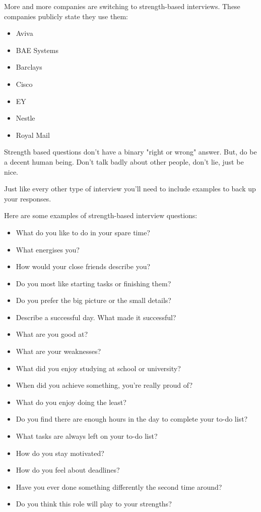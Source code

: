 \documentclass{article}
\begin{document}
More and more companies are switching to strength-based interviews.
These companies publicly state they use them:

\begin{itemize}
\item
  Aviva
\item
  BAE Systems
\item
  Barclays
\item
  Cisco
\item
  EY
\item
  Nestle
\item
  Royal Mail
\end{itemize}
Strength based questions don't have a binary "right or wrong" answer.
But, do be a decent human being. Don't talk badly about other people,
don't lie, just be nice.

Just like every other type of interview you'll need to include examples
to back up your responses.

Here are some examples of strength-based interview questions:

\begin{itemize}
\item
  What do you like to do in your spare time?
\item
  What energises you?
\item
  How would your close friends describe you?
\item
  Do you most like starting tasks or finishing them?
\item
  Do you prefer the big picture or the small details?
\item
  Describe a successful day. What made it successful?
\item
  What are you good at?
\item
  What are your weaknesses?
\item
  What did you enjoy studying at school or university?
\item
  When did you achieve something, you're really proud of?
\item
  What do you enjoy doing the least?
\item
  Do you find there are enough hours in the day to complete your to-do
  list?
\item
  What tasks are always left on your to-do list?
\item
  How do you stay motivated?
\item
  How do you feel about deadlines?
\item
  Have you ever done something differently the second time around?
\item
  Do you think this role will play to your strengths?
\end{itemize}
\end{document}
